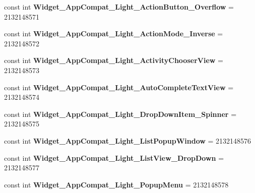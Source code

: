 \begin{DoxyCompactItemize}
\item 
\mbox{\label{classst_delivery_1_1_resource_1_1_style_ac28bca65fa266b82a3c30aa5c0cbbbfe}} 
const int {\bfseries Widget\+\_\+\+App\+Compat\+\_\+\+Light\+\_\+\+Action\+Button\+\_\+\+Overflow} = 2132148571
\item 
\mbox{\label{classst_delivery_1_1_resource_1_1_style_ac572c41fa1729cac938a9c65b9ab3fb1}} 
const int {\bfseries Widget\+\_\+\+App\+Compat\+\_\+\+Light\+\_\+\+Action\+Mode\+\_\+\+Inverse} = 2132148572
\item 
\mbox{\label{classst_delivery_1_1_resource_1_1_style_acda78442b7773e9b29482a2967858611}} 
const int {\bfseries Widget\+\_\+\+App\+Compat\+\_\+\+Light\+\_\+\+Activity\+Chooser\+View} = 2132148573
\item 
\mbox{\label{classst_delivery_1_1_resource_1_1_style_a7cf47315300fb186d6abb60e62c9fa92}} 
const int {\bfseries Widget\+\_\+\+App\+Compat\+\_\+\+Light\+\_\+\+Auto\+Complete\+Text\+View} = 2132148574
\item 
\mbox{\label{classst_delivery_1_1_resource_1_1_style_a1b56bcfaa8292e4da66bb7eea9b58a8f}} 
const int {\bfseries Widget\+\_\+\+App\+Compat\+\_\+\+Light\+\_\+\+Drop\+Down\+Item\+\_\+\+Spinner} = 2132148575
\item 
\mbox{\label{classst_delivery_1_1_resource_1_1_style_ab0aa94bc4c98f143668be1ceb5966e4c}} 
const int {\bfseries Widget\+\_\+\+App\+Compat\+\_\+\+Light\+\_\+\+List\+Popup\+Window} = 2132148576
\item 
\mbox{\label{classst_delivery_1_1_resource_1_1_style_af42e6dddc5dbc96783135da1b1c78c17}} 
const int {\bfseries Widget\+\_\+\+App\+Compat\+\_\+\+Light\+\_\+\+List\+View\+\_\+\+Drop\+Down} = 2132148577
\item 
\mbox{\label{classst_delivery_1_1_resource_1_1_style_a4f72a92a607151419bf8a0f5fe3d871b}} 
const int {\bfseries Widget\+\_\+\+App\+Compat\+\_\+\+Light\+\_\+\+Popup\+Menu} = 2132148578

\end{DoxyCompactItemize}

